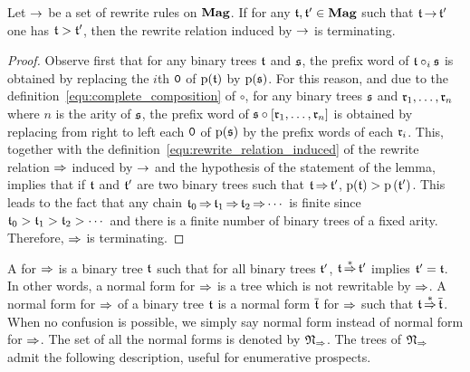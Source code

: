 \begin{Lemma}\label{lem:prefix_word_termination}
    Let $\operatorname{\to}$ be a set of rewrite rules on $\mathbf{Mag}$. If for any
    $\mathfrak{t}, \mathfrak{t}' \in \mathbf{Mag}$ such that $\mathfrak{t} \operatorname{\to} \mathfrak{t}'$ one has
    $\mathfrak{t} > \mathfrak{t}'$, then the rewrite relation induced by $\operatorname{\to}$ is
    terminating.
\end{Lemma}
\begin{proof}
    Observe first that for any binary trees $\mathfrak{t}$ and $\mathfrak{s}$, the
    prefix word of $\mathfrak{t} \circ_i \mathfrak{s}$ is obtained by replacing the
    $i$th $\mathtt{0}$ of $\mathrm{p}(\mathfrak{t})$ by $\mathrm{p}(\mathfrak{s})$. For
    this reason, and due to the
    definition~\eqref{equ:complete_composition} of $\circ$, for any
    binary trees $\mathfrak{s}$ and $\mathfrak{r}_1, \dots, \mathfrak{r}_n$ where $n$ is the
    arity of $\mathfrak{s}$, the prefix word of
    $\mathfrak{s} \circ \left[\mathfrak{r}_1, \dots, \mathfrak{r}_n\right]$ is obtained by
    replacing from right to left each $\mathtt{0}$ of $\mathrm{p}(\mathfrak{s})$ by
    the prefix words of each $\mathfrak{r}_i$. This, together with the
    definition~\eqref{equ:rewrite_relation_induced} of the rewrite
    relation $\operatorname{\Rightarrow}$ induced by $\operatorname{\to}$ and the hypothesis of the
    statement of the lemma, implies that if $\mathfrak{t}$ and $\mathfrak{t}'$ are two
    binary trees such that $\mathfrak{t} \operatorname{\Rightarrow} \mathfrak{t}'$,
    $\mathrm{p}(\mathfrak{t}) > \mathrm{p}\left(\mathfrak{t}'\right)$. This leads to
    the fact that any chain
    \begin{math}
        \mathfrak{t}_0 \operatorname{\Rightarrow} \mathfrak{t}_1 \operatorname{\Rightarrow} \mathfrak{t}_2 \operatorname{\Rightarrow} \cdots
    \end{math}
    is finite since
    \begin{math}
        \mathfrak{t}_0 > \mathfrak{t}_1 > \mathfrak{t}_2 > \cdots
    \end{math}
    and there is a finite number of binary trees of a fixed arity.
    Therefore, $\operatorname{\Rightarrow}$ is terminating.
\end{proof}
\medbreak

A  for $\operatorname{\Rightarrow}$ is a binary tree $\mathfrak{t}$ such
that for all binary trees $\mathfrak{t}'$, $\mathfrak{t} \operatorname{\overset{\ast}{\operatorname{\Rightarrow}}} \mathfrak{t}'$ implies
$\mathfrak{t}' = \mathfrak{t}$. In other words, a normal form for $\operatorname{\Rightarrow}$ is a
tree which is not rewritable by $\operatorname{\Rightarrow}$. A normal form for
$\operatorname{\Rightarrow}$ of a binary tree $\mathfrak{t}$ is a normal form $\overline{\mathfrak{t}}$
for $\operatorname{\Rightarrow}$ such that $\mathfrak{t}\operatorname{\overset{\ast}{\operatorname{\Rightarrow}}}\overline{\mathfrak{t}}$. When no
confusion is possible, we simply say normal form instead of normal form
for $\operatorname{\Rightarrow}$. The set of all the normal forms is denoted by
$\mathfrak{N}_{\operatorname{\Rightarrow}}$. The trees of $\mathfrak{N}_{\operatorname{\Rightarrow}}$
admit the following description, useful for enumerative prospects.
\medbreak

